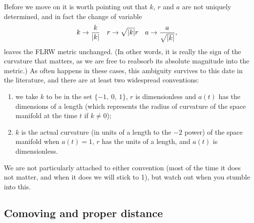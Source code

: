 Before we move on it is worth pointing out that $k$, $r$ and $a$ are not uniquely
determined, and in fact the change of variable
\begin{align*}
  k \rightarrow \frac{k}{\abs{k}} \quad
  r \rightarrow \sqrt{\abs{k}}r \quad
  a \rightarrow \frac{a}{\sqrt{\abs{k}}},
\end{align*}
leaves the FLRW metric unchanged. (In other words, it is really the sign of the
curvature that matters, as we are free to reabsorb its absolute magnitude into the
metric.) As often happens in these  cases, this ambiguity survives to this date in
the literature, and there are at least two widespread conventions:
\begin{enumerate}
  \item we take $k$ to be in the set $\{-1,~0,~1\}$, $r$ is dimensionless and
  $a(t)$ has the dimensions of a length (which represents the radius of curvature
  of the space manifold at the time $t$ if $k\neq 0$);
  \item $k$ is the actual curvature (in units of a length to the $-2$ power) of
  the space manifold when $a(t) = 1$, $r$ has the units of a length, and $a(t)$ is
  dimensionless.
\end{enumerate}
We are not particularly attached to either convention (most of the time it does not
matter, and when it does we will stick to 1), but watch out when you
stumble into this.


\subsection{Comoving and proper distance}

